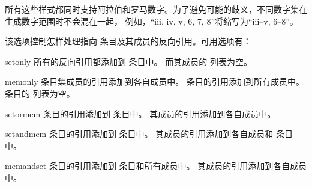 \begin{optionlist}
\begin{valuelist}
\end{valuelist}

所有这些样式都同时支持阿拉伯和罗马数字。为了避免可能的歧义，不同数字集在生成数字范围时不会混在一起，
例如，“iii, iv, v, 6, 7, 8”将缩写为“iii--v, 6--8”。


该选项控制怎样处理指向  条目及其成员的反向引用。可用选项有：

\begin{valuelist}

\item[setonly] %
所有的反向引用都添加到  条目中。
而其成员的  列表为空。

\item[memonly] %
条目集成员的引用添加到各自成员中。
 条目的引用添加到所有成员中。
 条目的  列表为空。

\item[setormem] %
 条目的引用添加到  条目中。
其成员的引用添加到各自成员中。

\item[setandmem] %
 条目的引用添加到   条目中。
其成员的引用添加到各自成员和  条目中。

\item[memandset] %
 条目的引用添加到   条目和所有成员中。
其成员的引用添加到各自成员中。


\end{valuelist}
\end{optionlist}
